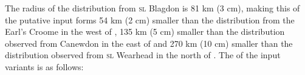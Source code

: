 \begin{figure}
\end{figure}

The radius of the distribution from \textsc{sl} Blagdon is 81 km (3 cm), making this  of the putative input forms 54 km (2 cm) smaller than the distribution from the Earl's Croome in the west of , 135 km (5 cm) smaller than the distribution observed from Canewdon in the east of  and 270 km (10 cm) smaller than the distribution observed from \textsc{sl} Wearhead in the north of . The  of the input variants is as follows:


